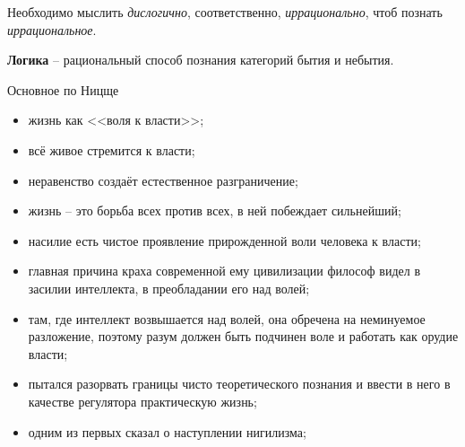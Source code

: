 Необходимо мыслить \emph{дислогично}, соответственно, \emph{иррационально}, чтоб познать 
\emph{иррациональное}. 

\textbf{Логика} -- рациональный способ познания категорий бытия и небытия.

Основное по Ницще
\begin{itemize}
    \item жизнь как <<воля к власти>>;
    \item всё живое стремится к власти;
    \item неравенство создаёт естественное разграничение;
    \item жизнь -- это борьба всех против всех, в ней побеждает сильнейший;
    \item насилие есть чистое проявление прирожденной воли человека к власти;
    \item главная причина краха современной ему цивилизации философ видел в засилии интеллекта, в 
        преобладании его над волей;
    \item там, где интеллект возвышается над волей, она обречена на неминуемое разложение, поэтому разум 
        должен быть подчинен воле и работать как орудие власти;
    \item пытался разорвать границы чисто теоретического познания и ввести в него в качестве регулятора 
        практическую жизнь;
    \item одним из первых сказал о наступлении нигилизма;
\end{itemize}